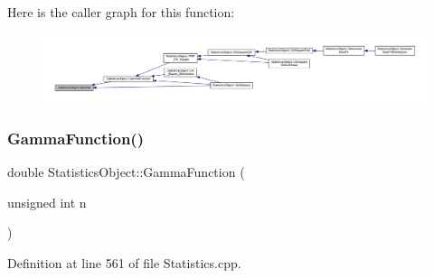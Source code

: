 Here is the caller graph for this function\+:
\nopagebreak
\begin{figure}[H]
\begin{center}
\leavevmode
\includegraphics[width=350pt]{class_statistics_object_a033c5346639a0dd44b68838a49bdd926_icgraph}
\end{center}
\end{figure}
\mbox{\label{class_statistics_object_a0d9dc9480288e61b3e98134deb18d2d4}} 
\subsubsection{\texorpdfstring{Gamma\+Function()}{GammaFunction()}}
{\footnotesize\ttfamily double Statistics\+Object\+::\+Gamma\+Function (\begin{DoxyParamCaption}\item[{unsigned int}]{n }\end{DoxyParamCaption})\hspace{0.3cm}{\ttfamily [protected]}}



Definition at line 561 of file Statistics.\+cpp.

